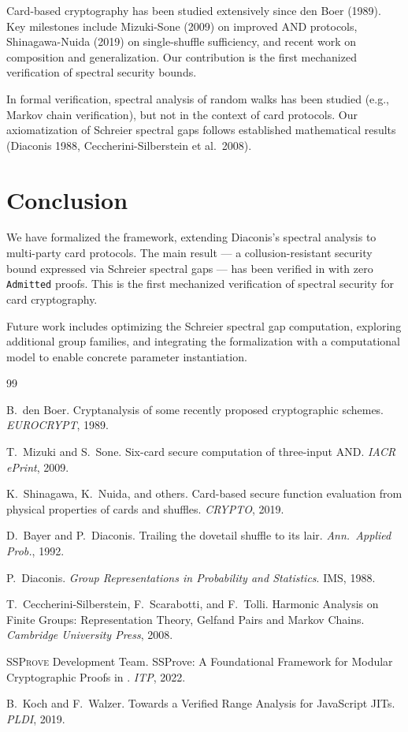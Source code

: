 \documentclass[11pt,a4paper]{article}
\begin{document}
Card-based cryptography has been studied extensively since den Boer (1989).
Key milestones include Mizuki-Sone (2009) on improved AND protocols, Shinagawa-Nuida (2019) on single-shuffle sufficiency, and recent work on composition and generalization.
Our contribution is the first mechanized verification of spectral security bounds.

In formal verification, spectral analysis of random walks has been studied (e.g., Markov chain verification), but not in the context of card protocols.
Our axiomatization of Schreier spectral gaps follows established mathematical results (Diaconis 1988, Ceccherini-Silberstein et al.\ 2008).

\section{Conclusion}
\label{sec:conclusion}

We have formalized the \pgg framework, extending Diaconis's spectral analysis to multi-party card protocols.
The main result — a collusion-resistant security bound expressed via Schreier spectral gaps — has been verified in \Rocq with zero \texttt{Admitted} proofs.
This is the first mechanized verification of spectral security for card cryptography.

Future work includes optimizing the Schreier spectral gap computation, exploring additional group families, and integrating the formalization with a computational model to enable concrete parameter instantiation.

\begin{thebibliography}{99}

B.\ den Boer.
Cryptanalysis of some recently proposed cryptographic schemes.
\textit{EUROCRYPT}, 1989.

T.\ Mizuki and S.\ Sone.
Six-card secure computation of three-input AND.
\textit{IACR ePrint}, 2009.

K.\ Shinagawa, K.\ Nuida, and others.
Card-based secure function evaluation from physical properties of cards and shuffles.
\textit{CRYPTO}, 2019.

D.\ Bayer and P.\ Diaconis.
Trailing the dovetail shuffle to its lair.
\textit{Ann.\ Applied Prob.}, 1992.

P.\ Diaconis.
\textit{Group Representations in Probability and Statistics}.
IMS, 1988.

T.\ Ceccherini-Silberstein, F.\ Scarabotti, and F.\ Tolli.
Harmonic Analysis on Finite Groups: Representation Theory, Gelfand Pairs and Markov Chains.
\textit{Cambridge University Press}, 2008.

\textsc{SSProve} Development Team.
SSProve: A Foundational Framework for Modular Cryptographic Proofs in \Rocq.
\textit{ITP}, 2022.

B.\ Koch and F.\ Walzer.
Towards a Verified Range Analysis for JavaScript JITs.
\textit{PLDI}, 2019.

\end{thebibliography}
\end{document}
